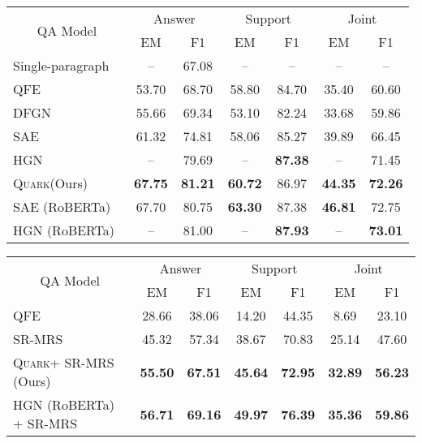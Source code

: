 \documentclass[11pt,a4paper]{article}
\newcommand\model{\textsc{Quark}\xspace}
\newcommand{\hpqa}{HotpotQA\xspace}
\newcommand{\roberta}{RoBERTa\xspace}
\newcommand\T{\rule{0pt}{2.6ex}}       \newcommand\B{\rule[-1.2ex]{0pt}{0pt}} \newcommand\R{\rule{0pt}{2.0ex}}       \newcommand{\selectmod}{\rowcolor{purple!15}}
\begin{document}
\begin{table*}
    \centering
    \small
    \setlength{\tabcolsep}{10pt}
    \setlength{\doublerulesep}{\arrayrulewidth}
\begin{tabular}{l|cc|cc|cc}
    \hline \hline
    \multicolumn{1}{c|}{\multirow{2}{*}{QA Model}} & \multicolumn{2}{c|}{\T Answer} & \multicolumn{2}{c|}{Support} & \multicolumn{2}{c}{Joint} \\
    & \T EM & F1 & EM & F1 & EM & F1 \\
    \hline
\T Single-paragraph~\cite{Min2019CompositionalQD} & -- & 67.08 & -- & -- & -- & -- \\
    QFE~\cite{qfe} & 53.70 & 68.70 & 58.80 & 84.70 & 35.40 & 60.60 \\
    DFGN~\cite{dfgn} & 55.66 & 69.34 & 53.10 & 82.24 & 33.68 & 59.86 \\
    SAE~\cite{sae} & 61.32 & 74.81 & 58.06 & 85.27 & 39.89 & 66.45 \\
    HGN~\cite{hgn} & -- & 79.69 & -- & \textbf{87.38} & -- & 71.45 \\
    \selectmod \model (Ours) & \textbf{67.75} & \textbf{81.21} & \textbf{60.72} & 86.97 & \textbf{44.35} & \textbf{72.26} \\
    \hline
    \T SAE (\roberta)~\cite{sae} & 67.70 & 80.75 & \textbf{63.30} & 87.38 & \textbf{46.81} & 72.75 \\
    HGN (\roberta)~\cite{hgn} & -- & 81.00 & -- & \textbf{87.93} & -- & \textbf{73.01} \\
    \hline \hline
    \end{tabular}
    \caption{\hpqa's distractor setting, Dev set. The bottom two models use larger language models than \model. }
    \label{tab:distractor_results}
\end{table*}

\begin{table*}
    \centering
    \small
    \setlength{\tabcolsep}{10pt}
    \setlength{\doublerulesep}{\arrayrulewidth}
\begin{tabular}{l|cc|cc|cc}
    \hline \hline
    \multicolumn{1}{c|}{\multirow{2}{*}{QA Model}} & \multicolumn{2}{c|}{\T Answer} & \multicolumn{2}{c|}{Support} & \multicolumn{2}{c}{Joint} \\
    & \T EM & F1 & EM & F1 & EM & F1 \\
    \hline
\T QFE~\cite{qfe} & 28.66 & 38.06 & 14.20 & 44.35 & 8.69 & 23.10 \\
    SR-MRS~\cite{semanticmrs} & 45.32 & 57.34 & 38.67 & 70.83 & 25.14 & 47.60 \\
    \selectmod \model + SR-MRS (Ours) & \textbf{55.50} & \textbf{67.51} & \textbf{45.64} & \textbf{72.95} & \textbf{32.89} & \textbf{56.23} \\
    \hline
    \T
    HGN (\roberta) + SR-MRS ~\cite{hgn} & \textbf{56.71} & \textbf{69.16} & \textbf{49.97} & \textbf{76.39} & \textbf{35.36} & \textbf{59.86} \\
    \hline \hline
    \end{tabular}
    \caption{\hpqa's fullwiki setting, Test set. The bottom-most model uses a larger language model than \model.}
    \label{tab:fullwiki_results}
\end{table*}
\end{document}
